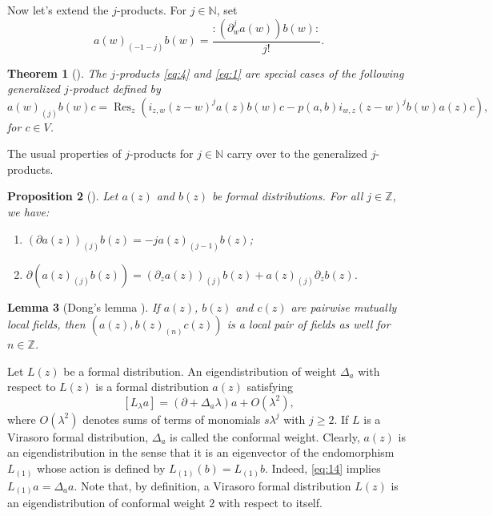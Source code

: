 \documentclass[a4paper, 12pt, reqno]{amsart}
\newtheorem{theorem}{Theorem}[subsection]
\newtheorem{lemma}[theorem]{Lemma}
\newtheorem{proposition}[theorem]{Proposition}
\theoremstyle{remark}
\numberwithin{equation}{subsection}
\DeclareMathOperator{\Res}{Res}
\begin{document}
Now let's extend the $j$-products.
For $j \in \mathbb{N}$, set
\begin{equation}
  \label{eq:13}
  a(w)_{(-1 - j)}b(w) = \frac{:(\partial^j_wa(w))b(w):}{j!}.
\end{equation}

\begin{theorem}[{\cite[Proposition 3.4.3]{nozaradan_introduction_2008}}]
  \label{thr:8}
  The $j$-products \eqref{eq:4} and \eqref{eq:1} are special cases of the following generalized $j$-product defined by
  \begin{equation*}
    a(w)_{(j)}b(w)c = \Res_z(i_{z, w}(z - w)^ja(z)b(w)c - p(a,b)i_{w, z}(z - w)^jb(w)a(z)c),
  \end{equation*}
  for $c \in V$.
\end{theorem}

The usual properties of $j$-products for $j \in \mathbb{N}$ carry over to the generalized $j$-products.

\begin{proposition}[{\cite[Proposition 3.4.4]{nozaradan_introduction_2008}}]
  \label{prp:6}
  Let $a(z)$ and $b(z)$ be formal distributions.
  For all $j \in \mathbb{Z}$, we have:
  \begin{enumerate}
  \item $(\partial a(z))_{(j)}b(z) = -ja(z)_{(j - 1)}b(z)$;
  \item $\partial(a(z)_{(j)}b(z)) = (\partial_za(z))_{(j)}b(z) + a(z)_{(j)}\partial_zb(z)$.
  \end{enumerate}
\end{proposition}

\begin{lemma}[Dong's lemma {\cite[Lemma 3.2]{kac_vertex_1998}}]
  \label{lmm:4}
  If $a(z)$, $b(z)$ and $c(z)$ are pairwise mutually local fields, then $(a(z),b(z)_{(n)}c(z))$ is a local pair of fields as well for $n\in \mathbb{Z}$.
\end{lemma}

Let $L(z)$ be a formal distribution.
An eigendistribution of weight $\Delta_a$ with respect to $L(z)$ is a formal distribution $a(z)$ satisfying
\begin{equation}
  \label{eq:14}
  [L_{\lambda}a] = (\partial + \Delta_a\lambda)a + O(\lambda^2),
\end{equation}
where $O(\lambda^2)$ denotes sums of terms of monomials $s\lambda^j$ with $j \ge 2$.
If $L$ is a Virasoro formal distribution, $\Delta_a$ is called the conformal weight.
Clearly, $a(z)$ is an eigendistribution in the sense that it is an eigenvector of the endomorphism $L_{(1)}$ whose action is defined by $L_{(1)}(b) = L_{(1)}b$.
Indeed, \eqref{eq:14} implies $L_{(1)}a = \Delta_aa$.
Note that, by definition, a Virasoro formal distribution $L(z)$ is an eigendistribution of conformal weight $2$ with respect to itself.
\end{document}
